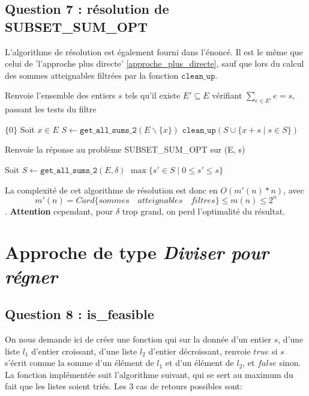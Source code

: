 \documentclass[10pt]{article}
\let\oldReturn\Return
\renewcommand{\Return}{\State\oldReturn}
\begin{document}
			\subsection{Question 7 : résolution de SUBSET\_SUM\_OPT}
				L'algorithme de résolution est également fourni dans l'énoncé.
				Il est le même que celui de 'l'approche plus directe' \ref{approche_plus_directe}, sauf que
				lors du calcul des sommes atteignables filtrées par la fonction $\mathtt{clean\_up}$.
				
				\begin{algorithm}
					\caption{Renvoie l'ensemble des entiers $s$ tels qu'il existe
							$E' \subseteq E$ vérifiant $\sum\limits_{e \in E'}e = s$, passant les tests du filtre}
					\begin{algorithmic}[1]
								\Return $\{0\}$
							\EndIf
							\State Soit $x \in E$
							\State $S \leftarrow \mathtt{get\_all\_sums\_2}(E \backslash \{x\})$
							\Return $\mathtt{clean\_up}(S \cup \{x + s \mid s \in S\})$
						\EndFunction
					\end{algorithmic}
				\end{algorithm}
			
			\begin{algorithm}
				\caption{Renvoie la réponse au problème SUBSET\_SUM\_OPT sur (E, s)}
				\begin{algorithmic}[1]
					\Function{subset\_sum}{$E \subset \mathbb{N}, s \in \mathbb{N}$}
						\State Soit $S \leftarrow \mathtt{get\_all\_sums\_2}(E, \delta)$
						\Return $\max\{s' \in S \mid 0 \leq s' \leq s\}$
					\EndFunction
				\end{algorithmic}
			\end{algorithm}
			La complexité de cet algorithme de résolution est donc en $\boxed{O(m'(n) * n)}$,
			avec $$m'(n) = Card\{sommes \quad atteignables \quad filtres\} \leq m(n) \leq 2^n$$.
			\textbf{Attention} cependant, pour $\delta$ trop grand, on perd l'optimalité du résultat.

		\newpage
		\section{Approche de type \textit{Diviser pour régner}}\label{approche_diviser_pour_regner}
			\subsection{Question 8 : is\_feasible}\label{is_feasible}
				On nous demande ici de créer une fonction qui sur la donnée d'un entier $s$, d'une liste $l_1$ d'entier croissant,
				d'une liste $l_2$ d'entier décroissant, renvoie $true$ si $s$ s'écrit comme la somme d'un élément de $l_1$ et d'un
				élément de $l_2$, et $false$ sinon.
				\newline
				La fonction implémentée suit l'algorithme suivant, qui se sert au maximum du fait que les listes soient triés.
				Les 3 cas de retours possibles sont:
				
\end{document}
